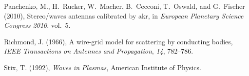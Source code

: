 \documentclass[draft,ras]{agutex}
\begin{document}
\begin{article}
\begin{thebibliography}{}
Panchenko, M., H.~Rucker, W.~Macher, B.~Cecconi, T.~Oswald, and G.~Fischer
  (2010), Stereo/waves antennas calibrated by akr, in \textit{European
  Planetary Science Congress 2010}, vol.~5.

Richmond, J. (1966), A wire-grid model for scattering by conducting bodies,
  \textit{IEEE Transactions on Antennes and Propagation}, \textit{14},
  782--786.

Stix, T. (1992), \textit{Waves in Plasmas}, American Institute of Physics.



\end{thebibliography}


\end{article}
\end{document}

